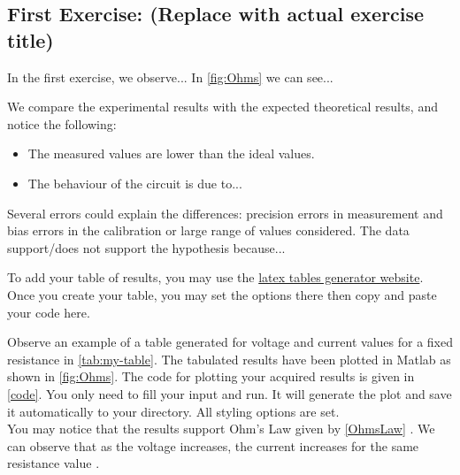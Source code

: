 \documentclass[journal]{IEEEtran}
\begin{document}
\subsection{First Exercise: (Replace with actual exercise title)}
In the first exercise, we observe... In \autoref{fig:Ohms} we can see...

We compare the experimental results with the expected theoretical results, and notice the following:
   \begin{itemize}
   \item The measured values are lower than the ideal values.
   \item The behaviour of the circuit is due to...
   \end{itemize}
   
Several errors could explain the differences: precision errors in measurement and bias errors in the calibration or large range of values considered. The data support/does not support the hypothesis because...

To add your table of results, you may use the \href{https://www.tablesgenerator.com/#}{latex tables generator website}. Once you create your table, you may set the options there then copy and paste your code here.

Observe an example of a table generated for voltage and current values for a fixed resistance in \autoref{tab:my-table}. The tabulated results have been plotted in Matlab as shown in \autoref{fig:Ohms}. The code for plotting your acquired results is given in \autoref{code}. You only need to fill your input and run. It will generate the plot and save it automatically to your directory. All styling options are set. \\
You may notice that the results support Ohm's Law given by \autoref{OhmsLaw} \cite{book1, book2}. We can observe that as the voltage increases, the current increases for the same resistance value \cite{paper1, paper2, paper3}. 

\begin{table}[!htbp]
\caption{Table caption goes here}
\label{tab:my-table}
\end{table}
\end{document}
